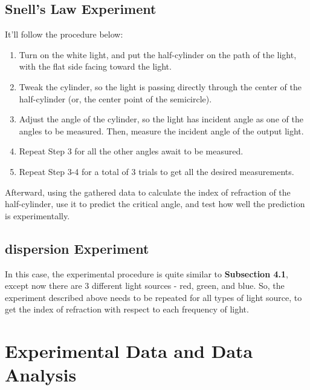 \documentclass{article}
\begin{document}
\subsection{Snell's Law Experiment}
It'll follow the procedure below:
\begin{enumerate}
    \item Turn on the white light, and put the half-cylinder on the path of the light, with the flat side facing toward the light.
    \item Tweak the cylinder, so the light is passing directly through the center of the half-cylinder (or, the center point of the semicircle).
    \item Adjust the angle of the cylinder, so the light has incident angle as one of the angles to be measured. Then, measure the incident angle of the output light.
    \item Repeat Step 3 for all the other angles await to be measured.
    \item Repeat Step 3-4 for a total of 3 trials to get all the desired measurements.
\end{enumerate}
Afterward, using the gathered data to calculate the index of refraction of the half-cylinder, use it to predict the critical angle, and test how well the prediction is experimentally.

\subsection{dispersion Experiment}
In this case, the experimental procedure is quite similar to \textbf{Subsection 4.1}, except now there are 3 different light sources - red, green, and blue. So, the experiment described above needs to be repeated for all types of light source, to get the index of refraction with respect to each frequency of light.

\newpage

\section{Experimental Data and Data Analysis}
\end{document}

